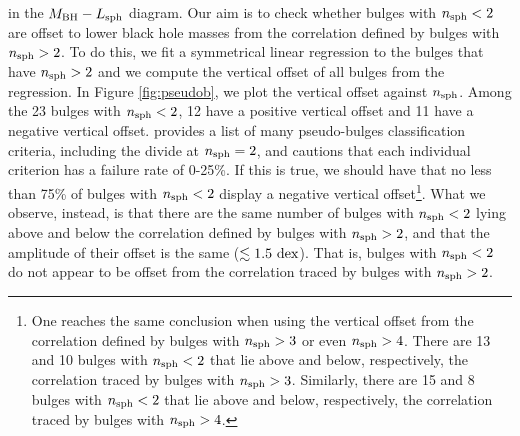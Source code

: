 \documentclass[preprint2]{emulateapj}
\begin{document}
in the $M_{\rm BH} - L_{\rm sph}$ diagram.
Our aim is to check whether bulges with $n_{\rm sph}<2$ 
are offset to lower black hole masses from the correlation defined by bulges with $n_{\rm sph}>2$. 
To do this, we fit a symmetrical linear regression to the bulges that have $n_{\rm sph}>2$ 
and we compute the vertical offset of all bulges from the regression. 
In Figure \ref{fig:pseudob}, we plot the vertical offset against $n_{\rm sph}$. 
Among the 23 bulges with $n_{\rm sph}<2$, 12 have a positive vertical offset and 11 have a negative vertical offset. 
\cite{kormendy2015review} provides a list of many pseudo-bulges classification criteria, including the divide at $n_{\rm sph}=2$, 
and cautions that each individual criterion has a failure rate of 0-25\%. 
If this is true, we should have that no less than 75\% of bulges with $n_{\rm sph}<2$ display a negative vertical offset\footnote{One 
reaches the same conclusion when using the vertical offset from the correlation defined by bulges with $n_{\rm sph}>3$ or even $n_{\rm sph}>4$. 
There are 13 and 10 bulges with $n_{\rm sph}<2$ that lie above and below, respectively, the correlation traced by bulges with $n_{\rm sph}>3$. 
Similarly, there are 15 and 8 bulges with $n_{\rm sph}<2$ that lie above and below, respectively, the correlation traced by bulges with $n_{\rm sph}>4$.}. 
What we observe, instead, is that there are the same number of bulges with $n_{\rm sph}<2$ lying above and below 
the correlation defined by bulges with $n_{\rm sph}>2$, 
and that the amplitude of their offset is the same ($\lesssim 1.5\rm~dex$).
That is, bulges with $n_{\rm sph}<2$ do not appear to be offset from the correlation traced by bulges with $n_{\rm sph}>2$. 
\end{document}
